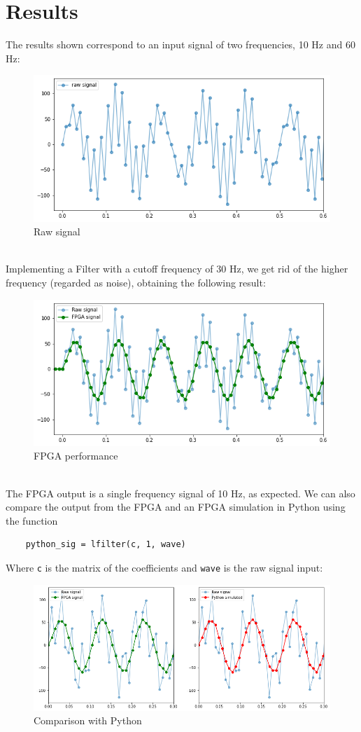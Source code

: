 \documentclass[11pt,a4paper,twocolumn]{IEEEtran}
\begin{document}
	\section{Results}
	The results shown correspond to an input signal of two frequencies, 10 Hz and 60 Hz: 
	\begin{figure}[h]
		\centering
		\includegraphics[width=.9\linewidth]{img/rawsig}
		\caption{Raw signal}
	\end{figure}\\
	Implementing a Filter with a cutoff frequency of 30 Hz, we get rid of the higher frequency (regarded as noise), obtaining the following result:
	\begin{figure}[h]
		\centering
		\includegraphics[width=.9\linewidth]{img/fpgaresult}
		\caption{FPGA performance}
	\end{figure}\\
	The FPGA output is a single frequency signal of 10 Hz, as expected. We can also compare the output from the FPGA and an FPGA simulation in Python using the function
	\begin{lstlisting}
	python_sig = lfilter(c, 1, wave)
	\end{lstlisting}
	Where \texttt{c} is the matrix of the coefficients and \texttt{wave} is the raw signal input:
	\begin{figure}[h]
		\centering
		\includegraphics[width=1\linewidth]{img/fpgapython}
		\caption{Comparison with Python}
	\end{figure}\\
\end{document}
